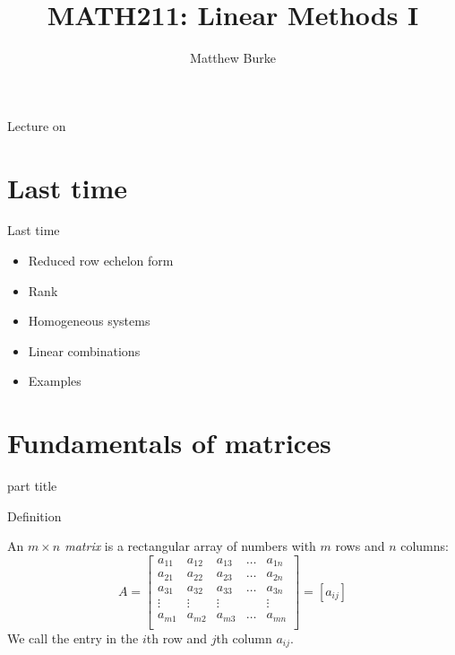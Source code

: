\documentclass{beamer}
\title{MATH211: Linear Methods I}
\author{Matthew Burke}
\date{\formatdate{13}{09}{2018}}
\begin{document}
\frame{\titlepage}

\begin{frame}{Lecture on }
  \tableofcontents
\end{frame}

\section{Last time}
\label{sec:Last-time}

\begin{frame}{Last time}
  \begin{itemize}
  \item Reduced row echelon form\vfill
  \item Rank\vfill
  \item Homogeneous systems\vfill
  \item Linear combinations\vfill
  \item Examples
  \end{itemize}
\end{frame}

\section{Fundamentals of matrices}

\begin{frame}
  \begin{beamercolorbox}[sep=12pt,center]{part title}
    \insertsection\par
  \end{beamercolorbox}
\end{frame}

\begin{frame}{Definition}
  \begin{definition}
    An \emph{$m\times n$ matrix} is a rectangular array of numbers with $m$ rows and $n$ columns:
    \begin{equation*}
      A=\left[
        \begin{array}{ccccc}
          a_{11} & a_{12} & a_{13} & \ldots & a_{1n} \\
          a_{21} & a_{22} & a_{23} & \ldots & a_{2n} \\
          a_{31} & a_{32} & a_{33} & \ldots & a_{3n} \\
          \vdots & \vdots & \vdots & & \vdots \\
          a_{m1} & a_{m2} & a_{m3} & \ldots & a_{mn} \\
        \end{array}
      \right] = \left[ a_{ij} \right]
    \end{equation*}
    We call the entry in the $i$th row and $j$th column $a_{ij}$.
  \end{definition}
\end{frame}
\end{document}
